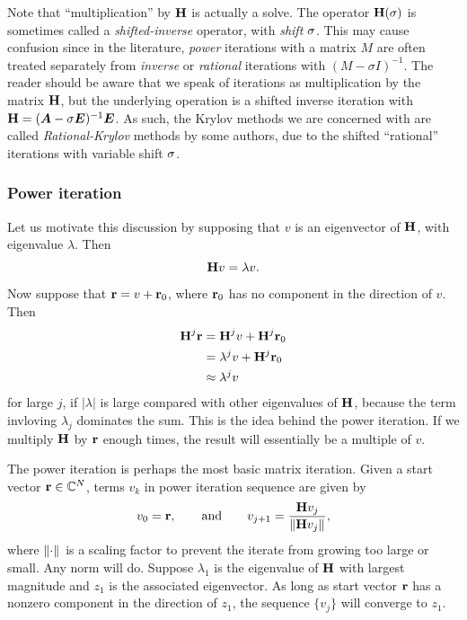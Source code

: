 \medskip{}
Note that ``multiplication'' by $\textbf{\textup{H}}$ is actually a solve.  The operator $\textbf{\textup{H}}(\sigma)$ is sometimes called a \emph{shifted-inverse} operator, with \emph{shift} $\sigma$.    This may cause confusion since in the literature, \emph{power} iterations with a matrix $M$ are often treated separately from \emph{inverse} or \emph{rational} iterations with $(M-\sigma I)^{-1}$.   The reader should be aware that we speak of iterations as multiplication by the matrix $\textbf{\textup{H}}$, but the underlying operation is a shifted inverse iteration with $\textbf{\textup{H}}= (\bm{A}-\sigma \bm{E})^{-1}\bm{E}$.  As such, the Krylov methods we are concerned with are called \emph{Rational-Krylov} methods by some authors, due to the shifted ``rational'' iterations with variable shift $\sigma$.


\subsubsection{Power iteration}\label{sec:power_iter}
Let us motivate this discussion by supposing that $v$ is an eigenvector of $\textbf{\textup{H}}$, with eigenvalue $\lambda$.
  Then 
\[
\textbf{\textup{H}} v = \lambda v.  
\]
Now suppose that $\textbf{\textup{r}}=v+\textbf{\textup{r}}_0$, where $\textbf{\textup{r}}_0$ has no component in the direction of $v$.  Then 
\begin{align*}
\textbf{\textup{H}}^j \textbf{\textup{r}} &= \textbf{\textup{H}}^j v + \textbf{\textup{H}}^j \textbf{\textup{r}}_0 \\
	&= \lambda^j v + \textbf{\textup{H}}^j \textbf{\textup{r}}_0\\
      &\approx  \lambda^j v
\end{align*}
for large $j$, if $| \lambda |$ is large compared with other eigenvalues of $\textbf{\textup{H}}$, because the term invloving $\lambda_j$ dominates the sum.  This is the idea behind the power iteration.  If we multiply $\textbf{\textup{H}}$ by $\textbf{\textup{r}}$ enough times, the result will essentially be a multiple of $v$.  

\bigskip
The power iteration is perhaps the most basic matrix iteration.  Given a start vector $\textbf{\textup{r}} \in \mathbb{C}^N$, terms $v_k$ in power iteration sequence are given by 
\begin{equation}
v_0 = \textbf{\textup{r}}, \qquad \text{and} \qquad v_{j+1} = \frac{\textbf{\textup{H}} v_j}{\left\| \textbf{\textup{H}} v_j \right\|_{}},
\label{eq:power_iter} 
\end{equation}
where $\left\| \cdot \right\|_{}$ is a scaling factor to prevent the iterate from growing too large or small.  Any norm will do.  Suppose $\lambda_1$ is the eigenvalue of $\textbf{\textup{H}}$ with largest magnitude and $z_1$ is the associated eigenvector.  As long as start vector $\textbf{\textup{r}}$ has a nonzero component in the direction of $z_1$,  the sequence $\{ v_j \}$ will converge to $z_1$.  

